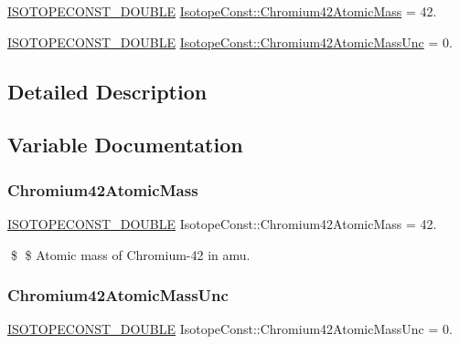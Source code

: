 \begin{DoxyCompactItemize}
\item 
\mbox{\hyperlink{group___isotope_const-_macros_ga8f45a7272ce02c0b4c65c44636ed719a}{I\+S\+O\+T\+O\+P\+E\+C\+O\+N\+S\+T\+\_\+\+D\+O\+U\+B\+LE}} \mbox{\hyperlink{group___isotope_const-_chromium-_cr42_ga306b8fdf83377925241f9cf53e4e1ead}{Isotope\+Const\+::\+Chromium42\+Atomic\+Mass}} = 42.
\item 
\mbox{\hyperlink{group___isotope_const-_macros_ga8f45a7272ce02c0b4c65c44636ed719a}{I\+S\+O\+T\+O\+P\+E\+C\+O\+N\+S\+T\+\_\+\+D\+O\+U\+B\+LE}} \mbox{\hyperlink{group___isotope_const-_chromium-_cr42_ga77ed77dd74b7b73408bd9d57717f2a80}{Isotope\+Const\+::\+Chromium42\+Atomic\+Mass\+Unc}} = 0.
\end{DoxyCompactItemize}


\subsection{Detailed Description}


\subsection{Variable Documentation}
\mbox{\label{group___isotope_const-_chromium-_cr42_ga306b8fdf83377925241f9cf53e4e1ead}} 
\subsubsection{\texorpdfstring{Chromium42\+Atomic\+Mass}{Chromium42AtomicMass}}
{\footnotesize\ttfamily \mbox{\hyperlink{group___isotope_const-_macros_ga8f45a7272ce02c0b4c65c44636ed719a}{I\+S\+O\+T\+O\+P\+E\+C\+O\+N\+S\+T\+\_\+\+D\+O\+U\+B\+LE}} Isotope\+Const\+::\+Chromium42\+Atomic\+Mass = 42.}

\$ \$ Atomic mass of Chromium-\/42 in amu. \mbox{\label{group___isotope_const-_chromium-_cr42_ga77ed77dd74b7b73408bd9d57717f2a80}} 
\subsubsection{\texorpdfstring{Chromium42\+Atomic\+Mass\+Unc}{Chromium42AtomicMassUnc}}
{\footnotesize\ttfamily \mbox{\hyperlink{group___isotope_const-_macros_ga8f45a7272ce02c0b4c65c44636ed719a}{I\+S\+O\+T\+O\+P\+E\+C\+O\+N\+S\+T\+\_\+\+D\+O\+U\+B\+LE}} Isotope\+Const\+::\+Chromium42\+Atomic\+Mass\+Unc = 0.}

